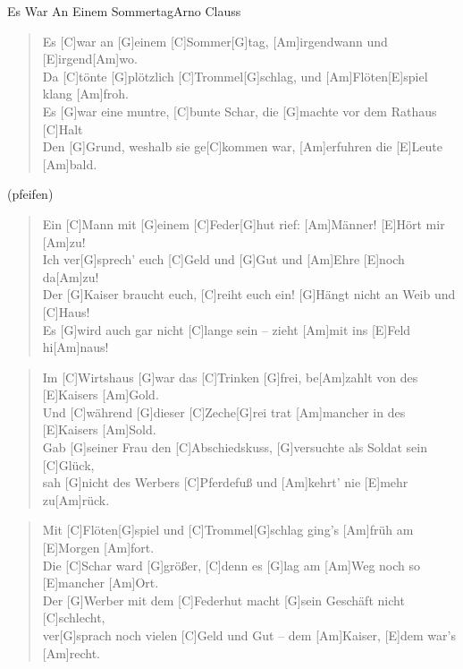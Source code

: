 \begin{song}{Es War An Einem Sommertag}{Arno Clauss}

    \begin{verse}  
        Es [C]war an [G]einem [C]Sommer[G]tag, [Am]irgendwann und [E]irgend[Am]wo. \\
        Da [C]tönte [G]plötzlich [C]Trommel[G]schlag, und [Am]Flöten[E]spiel klang [Am]froh. \\
        Es [G]war eine muntre, [C]bunte Schar, die [G]machte vor dem Rathaus [C]Halt \\
        Den [G]Grund, weshalb sie ge[C]kommen war, [Am]erfuhren die [E]Leute [Am]bald.
    \end{verse}  

    \begin{chorus}
        (pfeifen)
    \end{chorus}

    \begin{verse}  
        Ein [C]Mann mit [G]einem [C]Feder[G]hut rief: [Am]Männer! [E]Hört mir [Am]zu! \\
        [C]Ich ver[G]sprech' euch [C]Geld und [G]Gut und [Am]Ehre [E]noch da[Am]zu! \\
        Der [G]Kaiser braucht euch, [C]reiht euch ein! [G]Hängt nicht an Weib und [C]Haus! \\
        Es [G]wird auch gar nicht [C]lange sein – zieht [Am]mit ins [E]Feld hi[Am]naus!
    \end{verse}  


    \begin{verse}  
        Im [C]Wirtshaus [G]war das [C]Trinken [G]frei, be[Am]zahlt von des [E]Kaisers [Am]Gold. \\
        Und [C]während [G]dieser [C]Zeche[G]rei trat [Am]mancher in des [E]Kaisers [Am]Sold. \\
        Gab [G]seiner Frau den [C]Abschiedskuss, [G]versuchte als Soldat sein [C]Glück, \\
        sah [G]nicht des Werbers [C]Pferdefuß und [Am]kehrt' nie [E]mehr zu[Am]rück.
    \end{verse}  


    \begin{verse}  
        Mit [C]Flöten[G]spiel und [C]Trommel[G]schlag ging’s [Am]früh am [E]Morgen [Am]fort. \\
        Die [C]Schar ward [G]größer, [C]denn es [G]lag am [Am]Weg noch so [E]mancher [Am]Ort. \\
        Der [G]Werber mit dem [C]Federhut macht [G]sein Geschäft nicht [C]schlecht, \\
        ver[G]sprach noch vielen [C]Geld und Gut – dem [Am]Kaiser, [E]dem war’s [Am]recht.
    \end{verse}  


\end{song}
